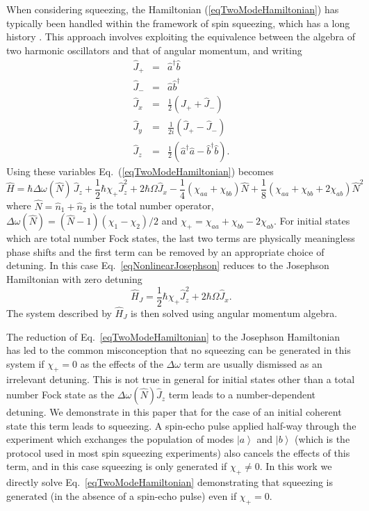 \documentclass{iopart}
\newcommand{\ket}[1]{\ensuremath{\left|#1\right>}}
\begin{document}
When considering squeezing, the Hamiltonian (\ref{eqTwoModeHamiltonian}) has typically been handled within the framework of spin squeezing, which has a long history \cite{kitagawaET1993, esteve2008,sorensenET1999, liebfriedET2004, wineland1994, steel+collett}. This approach involves exploiting the equivalence between the algebra of two harmonic oscillators and that of angular momentum, and writing
\begin{eqnarray}
\hat{J}_+ &=& \hat{a}^{\dagger} \hat{b} \\
\hat{J}_- &=& \hat{a} \hat{b}^{\dagger} \\
\hat{J}_x &=& \frac{1}{2} \left( \hat{J}_+ + \hat{J}_-\right) \\
\hat{J}_y &=& \frac{1}{2i} \left( \hat{J}_+ - \hat{J}_-\right) \\
\hat{J}_z &=& \frac{1}{2} \left( \hat{a}^{\dagger} \hat{a} - \hat{b}^{\dagger} \hat{b} \right).
\end{eqnarray}
Using these variables Eq.~(\ref{eqTwoModeHamiltonian}) becomes
\begin{equation}
\hat{H} = \hbar\Delta \omega(\hat{N}) \, \hat{J}_z + \frac{1}{2}\hbar\chi_+ \hat{J}_z^2 + 2\hbar\Omega \hat{J}_x - \frac{1}{4}\left(\chi_{aa} + \chi_{bb}\right)\hat{N} + \frac{1}{8} \left(\chi_{aa} + \chi_{bb} + 2\chi_{ab}\right) \hat{N}^2
\label{eqNonlinearJosephson}
\end{equation}
where $\hat{N}=\hat{n}_1 + \hat{n}_2$ is the total number operator, $\Delta \omega(\hat{N}) = (\hat{N}-1)\left(\chi_1 - \chi_2\right)/2$ and $\chi_+=\chi_{aa}+\chi_{bb}-2\chi_{ab}$. For initial states which are total number Fock states, the last two terms are physically meaningless phase shifts and the first term can be removed by an appropriate choice of detuning.  In this case Eq.~\eqref{eqNonlinearJosephson} reduces to the Josephson Hamiltonian with zero detuning \cite{steel+collett}
\begin{equation}
  \hat{H}_J = \frac{1}{2} \hbar\chi_+ \hat{J}_z^2 + 2\hbar \Omega \hat{J}_x. \label{eqJosephson}
\end{equation}
The system described by $\hat{H}_J$ is then solved using angular momentum algebra.

The reduction of Eq.~\eqref{eqTwoModeHamiltonian} to the Josephson Hamiltonian has led to the common misconception that no squeezing can be generated in this system if $\chi_+ = 0$ as the effects of the $\Delta\omega$ term are usually dismissed as an irrelevant detuning.  This is not true in general for initial states other than a total number Fock state as the $\Delta\omega(\hat{N})\hat{J}_z$ term leads to a number-dependent detuning.  We demonstrate in this paper that for the case of an initial coherent state this term leads to squeezing.  A spin-echo pulse applied half-way through the experiment which exchanges the population of modes $\ket{a}$ and $\ket{b}$ (which is the protocol used in most spin squeezing experiments) also cancels the effects of this term, and in this case squeezing is only generated if $\chi_+ \neq 0$.  In this work we directly solve Eq.~\eqref{eqTwoModeHamiltonian} demonstrating that squeezing is generated (in the absence of a spin-echo pulse) even if $\chi_+=0$.
\end{document}
